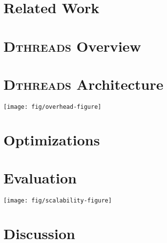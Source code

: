 \documentclass{acm_proc_onecol}
\newcommand{\dthreads}{{\scshape Dthreads}}
\newcommand{\Dthreads}{{\scshape Dthreads}}
\newcommand{\pthreads}{\texttt{pthreads}}
\begin{document}
\section{Related Work}


\section{{\bf \Large \Dthreads{}} Overview}


\section{{\bf \Large \Dthreads{}} Architecture}


\begin{figure*}[!t]
{\centering
\texttt{[image: fig/overhead-figure]}
\caption{Normalized execution time with respect to \pthreads{} (lower is better). For 9 of the 14 benchmarks, \dthreads{} runs nearly as fast or faster than \pthreads{}, while providing deterministic behavior.\label{fig:performance}}
}
\end{figure*}

\section{Optimizations}


\section{Evaluation}
\label{sec:evaluation}


\begin{figure*}
{\centering
\texttt{[image: fig/scalability-figure]}
\caption{
	Speedup with four and eight cores relative to two cores (higher is better).  \dthreads{} generally scales nearly as well or better than \pthreads{} and almost always as well or better than CoreDet.  CoreDet was unable to run \texttt{dedup} with two cores and \texttt{ferret} with four cores, so some scalability numbers are missing.\label{fig:scalability}}
}
\end{figure*}


\section{Discussion}

\end{document}
